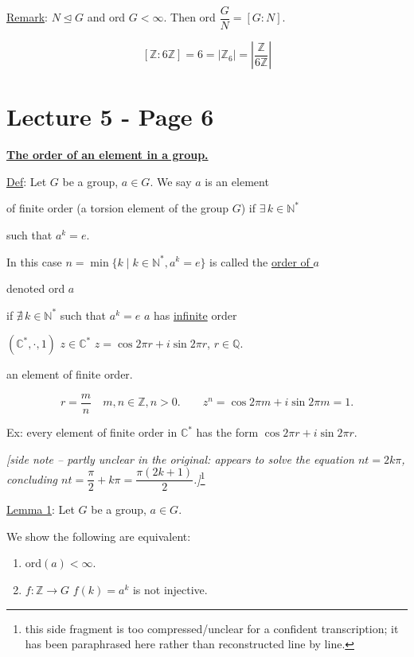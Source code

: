 \bigskip
\noindent\underline{Remark}: $N\trianglelefteq G$ and ord $G<\infty$. Then ord $\dfrac{G}{N} = [G:N]$.

\[
[\mathbb{Z}:6\mathbb{Z}] = 6 = |\mathbb{Z}_6| = \left|\frac{\mathbb{Z}}{6\mathbb{Z}}\right|
\]


\section*{Lecture 5 - Page 6}

\noindent\underline{\textbf{The order of an element in a group.}}

\bigskip
\noindent\underline{Def}: Let $G$ be a group, $a\in G$. We say $a$ is an element

\noindent of finite order (a torsion element of the group $G$) if $\exists\, k\in\mathbb{N}^*$

\noindent such that $a^k=e$.

\bigskip
\noindent In this case $n=\min\{k \mid k\in\mathbb{N}^*, a^k=e\}$ is called the \underline{order of $a$}

\noindent denoted ord $a$

\bigskip
\noindent if $\nexists\, k\in\mathbb{N}^*$ such that $a^k=e$ \quad $a$ has \underline{infinite} order

\bigskip
\noindent $(\mathbb{C}^*,\cdot,1)$ \quad $z\in\mathbb{C}^*$ \quad $z=\cos 2\pi r + i\sin 2\pi r$, $r\in\mathbb{Q}$.

\noindent an element of finite order.

\[
r=\frac{m}{n} \quad m,n\in\mathbb{Z}, n>0. \qquad z^n = \cos 2\pi m + i\sin 2\pi m = 1.
\]

\noindent Ex: every element of finite order in $\mathbb{C}^*$ has the form $\cos 2\pi r+i\sin 2\pi r$.

\bigskip
\noindent \textit{[side note -- partly unclear in the original: appears to solve the equation $nt=2k\pi$, concluding $nt=\dfrac{\pi}{2}+k\pi=\dfrac{\pi(2k+1)}{2}$.]}\footnote{this side fragment is too compressed/unclear for a confident transcription; it has been paraphrased here rather than reconstructed line by line.}

\bigskip
\noindent\underline{Lemma 1}: Let $G$ be a group, $a\in G$.

\noindent We show the following are equivalent:

\begin{enumerate}
\item[(1)] ord$(a)<\infty$.
\item[(2)] $f:\mathbb{Z}\to G$ \quad $f(k)=a^k$ is not injective.
\end{enumerate}


